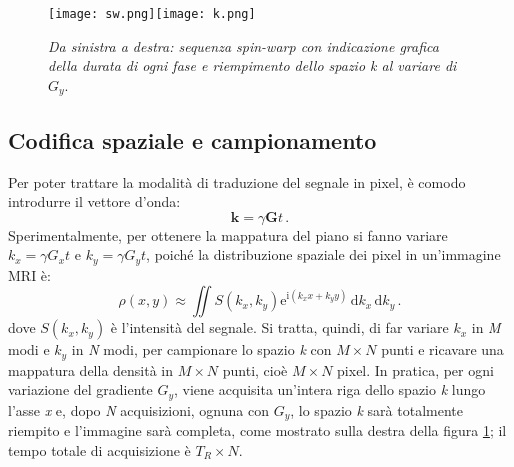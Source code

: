 \documentclass{report}
\newcommand{\figref}[1]{figura \ref{#1}}
\numberwithin{equation}{section}
\numberwithin{figure}{section}
\renewcommand{\Vec}{\bm}
\begin{document}
\vspace{- 7 pt}
\begin{figure}[htp]
\centering
\texttt{[image: sw.png]}\quad\texttt{[image: k.png]}
\caption{\label{fig:k} \textit{Da sinistra a destra: sequenza spin-warp con indicazione grafica della durata di ogni fase e riempimento dello spazio k al variare di $G_y$}.}
\end{figure}

\vspace{-12 pt}

\subsection{Codifica spaziale e campionamento} \label{1.4.4}
Per poter trattare la modalità di traduzione del segnale in pixel, è comodo introdurre il vettore d'onda:
\begin{equation}
    \Vec{k}=\gamma \Vec{G}t \,.
\end{equation}
Sperimentalmente, per ottenere la mappatura del piano si fanno variare $k_x=\gamma G_x t$ e $k_y=\gamma G_y t$, poiché la distribuzione spaziale dei pixel in un'immagine MRI è:
\begin{equation}
    \rho(x,y) \approx \iint S(k_x,k_y) \mathrm{e}^{\mathrm{i}(k_xx+k_yy)}\,\mathrm{d}k_x\,\mathrm{d}k_y\,.
\end{equation}
dove $S(k_x,k_y)$ è l'intensità del segnale. Si tratta, quindi, di far variare $k_x$ in \textit{M} modi e $k_y$ in \textit{N} modi, per campionare lo spazio \textit{k} con $M \times N$ punti e ricavare una mappatura della densità in $M \times N$ punti, cioè $M \times N$ pixel. In pratica, per ogni variazione del gradiente $G_y$, viene acquisita un’intera riga dello spazio \textit{k} lungo l’asse \textit{x} e, dopo \textit{N} acquisizioni, ognuna con $G_y$, lo spazio \textit{k} sarà totalmente riempito e l'immagine sarà completa, come mostrato sulla destra della \figref{fig:k}; il tempo totale di acquisizione è $T_R \times N$.
\end{document}
